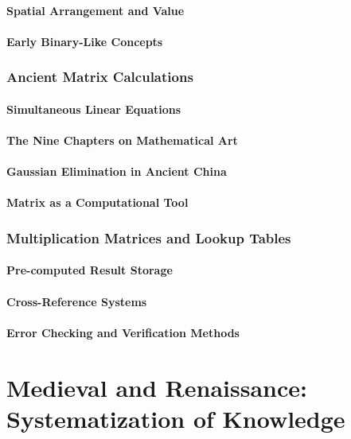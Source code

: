 \documentclass[12pt, oneside]{book}
\begin{document}
\subsubsection{Spatial Arrangement and Value}
\subsubsection{Early Binary-Like Concepts}

\subsection{Ancient Matrix Calculations}
\subsubsection{Simultaneous Linear Equations}
\subsubsection{The Nine Chapters on Mathematical Art}
\subsubsection{Gaussian Elimination in Ancient China}
\subsubsection{Matrix as a Computational Tool}

\subsection{Multiplication Matrices and Lookup Tables}
\subsubsection{Pre-computed Result Storage}
\subsubsection{Cross-Reference Systems}
\subsubsection{Error Checking and Verification Methods}


\chapter{Medieval and Renaissance: Systematization of Knowledge}
\end{document}
